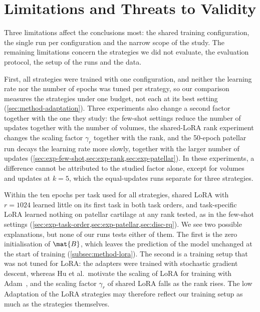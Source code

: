 \section{Limitations and Threats to Validity}
\label{sec:disc-limitations}

Three limitations affect the conclusions most: the shared training configuration, the single run per configuration and the narrow scope of the study.
The remaining limitations concern the strategies we did not evaluate, the evaluation protocol, the setup of the runs and the data.

First, all strategies were trained with one configuration, and neither the learning rate nor the number of epochs was tuned per strategy, so our comparison measures the strategies under one budget, not each at its best setting (\cref{sec:method-adaptation}).
Three experiments also change a second factor together with the one they study: the few-shot settings reduce the number of updates together with the number of volumes, the shared-LoRA rank experiment changes the scaling factor $\gamma_r$ together with the rank, and the 50-epoch patellar run decays the learning rate more slowly, together with the larger number of updates (\cref{sec:exp-few-shot,sec:exp-rank,sec:exp-patellar}).
In these experiments, a difference cannot be attributed to the studied factor alone, except for volumes and updates at $k = 5$, which the equal-updates runs separate for three strategies.

Within the ten epochs per task used for all strategies, shared LoRA with $r = 1024$ learned little on its first task in both task orders, and task-specific LoRA learned nothing on patellar cartilage at any rank tested, as in the few-shot settings (\cref{sec:exp-task-order,sec:exp-patellar,sec:disc-rq}).
We see two possible explanations, but none of our runs tests either of them.
The first is the zero initialisation of $\mat{B}$, which leaves the prediction of the model unchanged at the start of training (\cref{subsec:method-lora}).
The second is a training setup that was not tuned for LoRA: the adapters were trained with stochastic gradient descent, whereas Hu et al.\ motivate the scaling of LoRA for training with Adam~\cite[Sec.~4.1]{hu2022lora}, and the scaling factor $\gamma_r$ of shared LoRA falls as the rank rises.
The low Adaptation of the LoRA strategies may therefore reflect our training setup as much as the strategies themselves.

